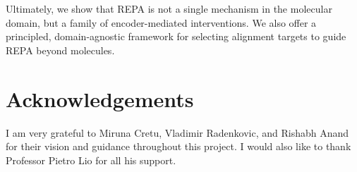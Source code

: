 \documentclass[12pt,a4paper,twoside]{report}
\newif\ifsubmission %
\begin{document}
Ultimately, we show that REPA is not a single mechanism in the molecular domain, but a family of encoder-mediated interventions. We also offer a principled, domain-agnostic framework for selecting alignment targets to guide REPA beyond molecules.

\ifsubmission\else

\chapter*{Acknowledgements}

I am very grateful to Miruna Cretu, Vladimir Radenkovic, and Rishabh Anand for their vision and guidance throughout this project. I would also like to thank Professor Pietro Lio for all his support.

\fi
\cleardoublepage %

\tableofcontents

%
%
\end{document}
